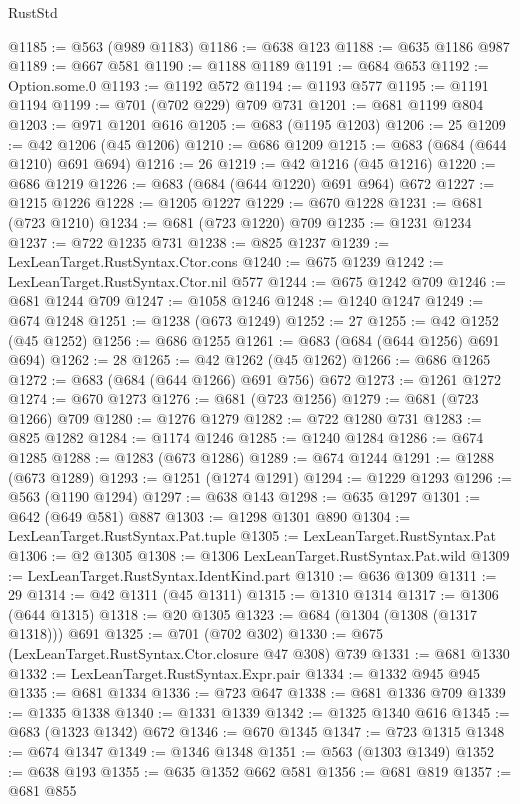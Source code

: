 \begin{lexlean}{RustStd}
\begin{coremodule}
@1185 := @563 (@989 @1183)
@1186 := @638 @123
@1188 := @635 @1186 @987
@1189 := @667 @581
@1190 := @1188 @1189
@1191 := @684 @653
@1192 := Option.some.{0}
@1193 := @1192 @572
@1194 := @1193 @577
@1195 := @1191 @1194
@1199 := @701 (@702 @229) @709 @731
@1201 := @681 @1199 @804
@1203 := @971 @1201 @616
@1205 := @683 (@1195 @1203)
@1206 := 25
@1209 := @42 @1206 (@45 @1206)
@1210 := @686 @1209
@1215 := @683 (@684 (@644 @1210) @691 @694)
@1216 := 26
@1219 := @42 @1216 (@45 @1216)
@1220 := @686 @1219
@1226 := @683 (@684 (@644 @1220) @691 @964) @672
@1227 := @1215 @1226
@1228 := @1205 @1227
@1229 := @670 @1228
@1231 := @681 (@723 @1210)
@1234 := @681 (@723 @1220) @709
@1235 := @1231 @1234
@1237 := @722 @1235 @731
@1238 := @825 @1237
@1239 := LexLeanTarget.RustSyntax.Ctor.cons
@1240 := @675 @1239
@1242 := LexLeanTarget.RustSyntax.Ctor.nil @577
@1244 := @675 @1242 @709
@1246 := @681 @1244 @709
@1247 := @1058 @1246
@1248 := @1240 @1247
@1249 := @674 @1248
@1251 := @1238 (@673 @1249)
@1252 := 27
@1255 := @42 @1252 (@45 @1252)
@1256 := @686 @1255
@1261 := @683 (@684 (@644 @1256) @691 @694)
@1262 := 28
@1265 := @42 @1262 (@45 @1262)
@1266 := @686 @1265
@1272 := @683 (@684 (@644 @1266) @691 @756) @672
@1273 := @1261 @1272
@1274 := @670 @1273
@1276 := @681 (@723 @1256)
@1279 := @681 (@723 @1266) @709
@1280 := @1276 @1279
@1282 := @722 @1280 @731
@1283 := @825 @1282
@1284 := @1174 @1246
@1285 := @1240 @1284
@1286 := @674 @1285
@1288 := @1283 (@673 @1286)
@1289 := @674 @1244
@1291 := @1288 (@673 @1289)
@1293 := @1251 (@1274 @1291)
@1294 := @1229 @1293
@1296 := @563 (@1190 @1294)
@1297 := @638 @143
@1298 := @635 @1297
@1301 := @642 (@649 @581) @887
@1303 := @1298 @1301 @890
@1304 := LexLeanTarget.RustSyntax.Pat.tuple
@1305 := LexLeanTarget.RustSyntax.Pat
@1306 := @2 @1305
@1308 := @1306 LexLeanTarget.RustSyntax.Pat.wild
@1309 := LexLeanTarget.RustSyntax.IdentKind.part
@1310 := @636 @1309
@1311 := 29
@1314 := @42 @1311 (@45 @1311)
@1315 := @1310 @1314
@1317 := @1306 (@644 @1315)
@1318 := @20 @1305
@1323 := @684 (@1304 (@1308 (@1317 @1318))) @691
@1325 := @701 (@702 @302)
@1330 := @675 (LexLeanTarget.RustSyntax.Ctor.closure @47 @308) @739
@1331 := @681 @1330
@1332 := LexLeanTarget.RustSyntax.Expr.pair
@1334 := @1332 @945 @945
@1335 := @681 @1334
@1336 := @723 @647
@1338 := @681 @1336 @709
@1339 := @1335 @1338
@1340 := @1331 @1339
@1342 := @1325 @1340 @616
@1345 := @683 (@1323 @1342) @672
@1346 := @670 @1345
@1347 := @723 @1315
@1348 := @674 @1347
@1349 := @1346 @1348
@1351 := @563 (@1303 @1349)
@1352 := @638 @193
@1355 := @635 @1352 @662 @581
@1356 := @681 @819
@1357 := @681 @855

\end{coremodule}
\end{lexlean}
